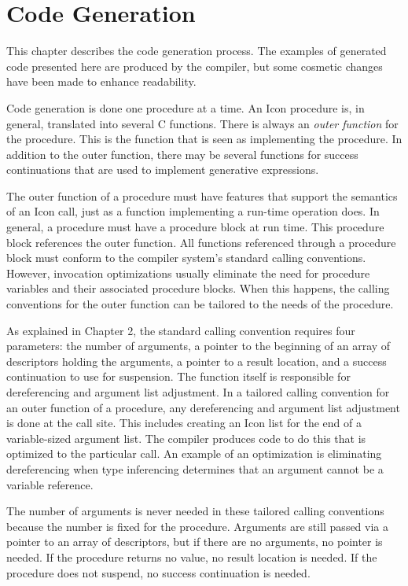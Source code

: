 \chapter{Code Generation}

This chapter describes the code generation process. The examples of
generated code presented here are produced by the compiler, but some
cosmetic changes have been made to enhance readability.

Code generation is done one procedure at a time. An Icon procedure is,
in general, translated into several C functions. There is always an
\textit{outer function}
for the procedure. This is the function that is seen as implementing
the procedure. In addition to the outer function, there may be several
functions for success continuations that are used to implement
generative expressions.

The outer function of a procedure must have features that support the
semantics of an Icon call, just as a function implementing a run-time
operation does. In general, a procedure must have a procedure block at
run time. This procedure block references the outer function. All
functions referenced through a procedure block must conform to the
compiler system's standard calling conventions. However, invocation
optimizations usually eliminate the need for procedure variables and
their associated procedure blocks. When this happens, the calling
conventions for the outer function can be tailored to the needs of the
procedure.

As explained in Chapter 2, the standard calling convention requires
four parameters: the number of arguments, a pointer to the beginning
of an array of descriptors holding the arguments, a pointer to a
result location, and a success continuation to use for suspension. The
function itself is responsible for dereferencing and argument list
adjustment.  In a tailored calling convention for an outer function of
a procedure, any dereferencing and argument list adjustment is done at
the call site. This includes creating an Icon list for the end of a
variable-sized argument list. The compiler produces code to do this
that is optimized to the particular call. An example of an
optimization is eliminating dereferencing when type inferencing
determines that an argument cannot be a variable reference.

The number of arguments is never needed in these tailored calling
conventions because the number is fixed for the procedure. Arguments
are still passed via a pointer to an array of descriptors, but if
there are no arguments, no pointer is needed. If the procedure returns
no value, no result location is needed. If the procedure does not
suspend, no success continuation is needed.

